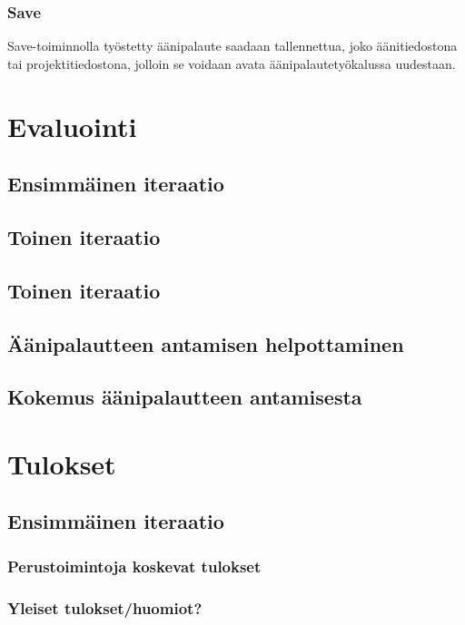 \documentclass[utf8]{gradu3}
\begin{document}
\subsection{Save}

Save-toiminnolla työstetty äänipalaute saadaan tallennettua, joko äänitiedostona tai projektitiedostona, jolloin se voidaan avata äänipalautetyökalussa uudestaan.

%

\chapter{Evaluointi}

\section{Ensimmäinen iteraatio}
\section{Toinen iteraatio}
\section{Toinen iteraatio}

\section{Äänipalautteen antamisen helpottaminen}
\section{Kokemus äänipalautteen antamisesta}

%

\chapter{Tulokset}
\section{Ensimmäinen iteraatio}
\subsection{Perustoimintoja koskevat tulokset}
\subsection{Yleiset tulokset/huomiot?}
\end{document}
